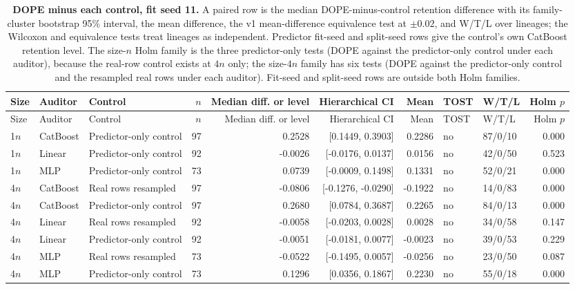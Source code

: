 \begin{longtable}{lllrrrrllr}
\caption{\textbf{DOPE minus each control, fit seed 11.} A paired row is the median DOPE-minus-control retention difference with its family-cluster bootstrap 95\% interval, the mean difference, the v1 mean-difference equivalence test at $\pm 0.02$, and W/T/L over lineages; the Wilcoxon and equivalence tests treat lineages as independent. Predictor fit-seed and split-seed rows give the control's own CatBoost retention level. The size-$n$ Holm family is the three predictor-only tests (DOPE against the predictor-only control under each auditor), because the real-row control exists at $4n$ only; the size-$4n$ family has six tests (DOPE against the predictor-only control and the resampled real rows under each auditor). Fit-seed and split-seed rows are outside both Holm families.}\label{tab:review-controls}\\
\toprule
Size & Auditor & Control & $n$ & Median diff. or level & Hierarchical CI & Mean & TOST & W/T/L & Holm $p$ \\
\midrule
\endfirsthead
\toprule
Size & Auditor & Control & $n$ & Median diff. or level & Hierarchical CI & Mean & TOST & W/T/L & Holm $p$ \\
\midrule
\endhead
1$n$ & CatBoost & Predictor-only control & 97 & 0.2528 & [0.1449, 0.3903] & 0.2286 & no & 87/0/10 & 0.000 \\
1$n$ & Linear & Predictor-only control & 92 & -0.0026 & [-0.0176, 0.0137] & 0.0156 & no & 42/0/50 & 0.523 \\
1$n$ & MLP & Predictor-only control & 73 & 0.0739 & [-0.0009, 0.1498] & 0.1331 & no & 52/0/21 & 0.000 \\
4$n$ & CatBoost & Real rows resampled & 97 & -0.0806 & [-0.1276, -0.0290] & -0.1922 & no & 14/0/83 & 0.000 \\
4$n$ & CatBoost & Predictor-only control & 97 & 0.2680 & [0.0784, 0.3687] & 0.2265 & no & 84/0/13 & 0.000 \\
4$n$ & Linear & Real rows resampled & 92 & -0.0058 & [-0.0203, 0.0028] & 0.0028 & no & 34/0/58 & 0.147 \\
4$n$ & Linear & Predictor-only control & 92 & -0.0051 & [-0.0181, 0.0077] & -0.0023 & no & 39/0/53 & 0.229 \\
4$n$ & MLP & Real rows resampled & 73 & -0.0522 & [-0.1495, 0.0057] & -0.0256 & no & 23/0/50 & 0.087 \\
4$n$ & MLP & Predictor-only control & 73 & 0.1296 & [0.0356, 0.1867] & 0.2230 & no & 55/0/18 & 0.000 \\

\end{longtable}
